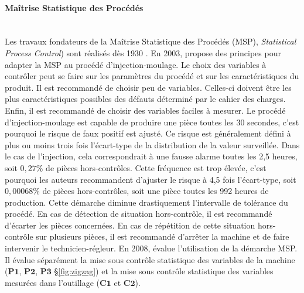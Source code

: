 \paragraph{Maîtrise Statistique des Procédés}\mbox{} \label{parag:spc} \\
Les travaux fondateurs de la Maîtrise Statistique des Procédés (MSP), \textit{Statistical Process Control}) sont réalisés dès 1930 \cite{shewhart_economic_1930, shewhart_economic_1931}.
En 2003, \cite{pillet_maitrise_2003} propose des principes pour adapter la MSP au procédé d'injection-moulage.
Le choix des variables à contrôler peut se faire sur les paramètres du procédé et sur les caractéristiques du produit.
Il est recommandé de choisir peu de variables. Celles-ci doivent être les plus caractéristiques possibles des défauts déterminé par le cahier des charges.
Enfin, il est recommandé de choisir des variables faciles à mesurer.
Le procédé d'injection-moulage est capable de produire une pièce toutes les 30 secondes, c'est pourquoi le risque de faux positif est ajusté.
Ce risque est généralement défini à plus ou moins trois fois l'écart-type de la distribution de la valeur surveillée.
Dans le cas de l'injection, cela correspondrait à une fausse alarme toutes les 2,5 heures, soit $0,27\%$ de pièces hors-contrôles.
Cette fréquence est trop élevée, c'est pourquoi les auteurs recommandent d'ajuster le risque à 4,5 fois l'écart-type, soit $0,00068\%$ de pièces hors-contrôles, soit une pièce toutes les 992 heures de production.
Cette démarche diminue drastiquement l'intervalle de tolérance du procédé.
En cas de détection de situation hors-contrôle, il est recommandé d'écarter les pièces concernées.
En cas de répétition de cette situation hors-contrôle sur plusieurs pièces, il est recommandé d'arrêter la machine et de faire intervenir le technicien-régleur.
En 2008, \cite{kazmer_comparison_2008} évalue l'utilisation de la démarche MSP.
Il évalue séparément la mise sous contrôle statistique des variables de la machine ($\boldsymbol{P1}$, $\boldsymbol{P2}$, $\boldsymbol{P3}$ §\ref{fig:zigzag}) et la mise sous contrôle statistique des variables mesurées dans l'outillage ($\boldsymbol{C1}$ et $\boldsymbol{C2}$).

